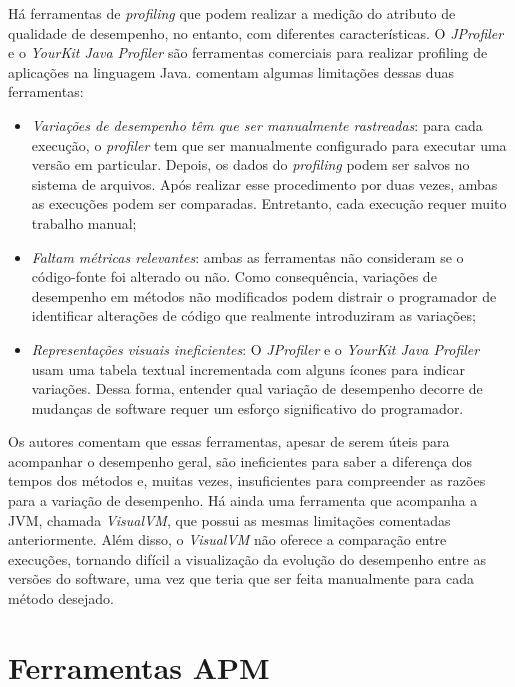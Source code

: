 Há ferramentas de \textit{profiling} que podem realizar a medição do atributo de qualidade de desempenho, no entanto, com diferentes características. O \textit{JProfiler} \cite{JProfiler} e o \textit{YourKit Java Profiler} \cite{Profiler2016} são ferramentas comerciais para realizar profiling de aplicações na linguagem Java. \citeauthor{SandovalAlcocer2013} comentam algumas limitações dessas duas ferramentas:
\begin{itemize}
	\item \textit{Variações de desempenho têm que ser manualmente rastreadas}: para cada execução, o \textit{profiler} tem que ser manualmente configurado para executar uma versão em particular. Depois, os dados do \textit{profiling} podem ser salvos no sistema de arquivos. Após realizar esse procedimento por duas vezes, ambas as execuções podem ser comparadas. Entretanto, cada execução requer muito trabalho manual;
	\item \textit{Faltam métricas relevantes}: ambas as ferramentas não consideram se o código-fonte foi alterado ou não. Como consequência, variações de desempenho em métodos não modificados podem distrair o programador de identificar alterações de código que realmente introduziram as variações;
	\item \textit{Representações visuais ineficientes}: O \textit{JProfiler} e o \textit{YourKit Java Profiler} usam uma tabela textual incrementada com alguns ícones para indicar variações. Dessa forma, entender qual variação de desempenho decorre de mudanças de software requer um esforço significativo do programador.
\end{itemize}

Os autores comentam que essas ferramentas, apesar de serem úteis para acompanhar o desempenho geral, são ineficientes para saber a diferença dos tempos dos métodos e, muitas vezes, insuficientes para compreender as razões para a variação de desempenho. Há ainda uma ferramenta que acompanha a JVM, chamada \textit{VisualVM}, que possui as mesmas limitações comentadas anteriormente. Além disso, o \textit{VisualVM} não oferece a comparação entre execuções, tornando difícil a visualização da evolução do desempenho entre as versões do software, uma vez que teria que ser feita manualmente para cada método desejado.

\section{Ferramentas APM} \label{sec:trabalhos-relacionados-ferramentas-apm}

